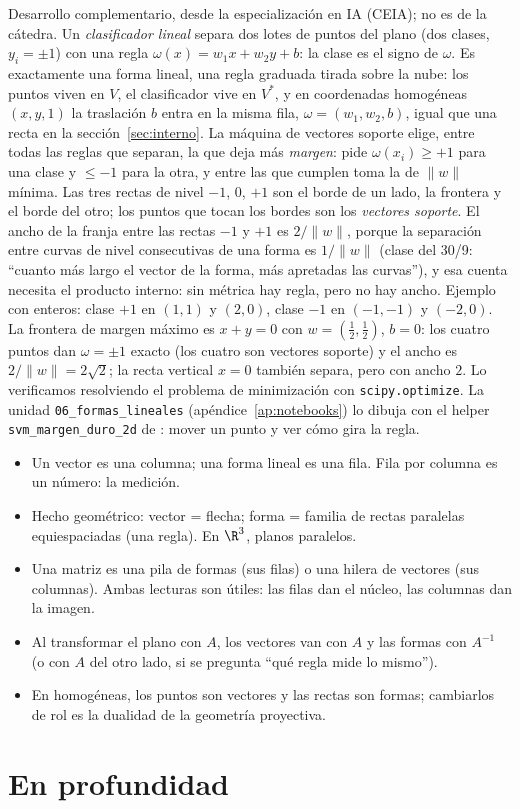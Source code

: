 \begin{idea}
Desarrollo complementario, desde la especialización en IA (CEIA); no es de la cátedra. Un
\emph{clasificador lineal} separa dos lotes de puntos del plano (dos clases, \(y_i=\pm1\))
con una regla \(\omega(x)=w_1x+w_2y+b\): la clase es el signo de \(\omega\). Es exactamente
una forma lineal, una regla graduada tirada sobre la nube: los puntos viven en \(V\), el
clasificador vive en \(V^{*}\), y en coordenadas homogéneas \((x,y,1)\) la traslación \(b\)
entra en la misma fila, \(\omega=(w_1,w_2,b)\), igual que una recta en la
sección~\ref{sec:interno}. La máquina de vectores soporte elige, entre todas las reglas
que separan, la que deja más \emph{margen}: pide \(\omega(x_i)\ge+1\) para una clase y
\(\le-1\) para la otra, y entre las que cumplen toma la de \(\|w\|\) mínima. Las tres
rectas de nivel \(-1\), \(0\), \(+1\) son el borde de un lado, la frontera y el borde del
otro; los puntos que tocan los bordes son los \emph{vectores soporte}. El ancho de la
franja entre las rectas \(-1\) y \(+1\) es \(2/\|w\|\), porque la separación entre
curvas de nivel consecutivas de una forma es \(1/\|w\|\) (clase del 30/9: ``cuanto más
largo el vector de la forma, más apretadas las curvas''), y esa cuenta necesita el
producto interno: sin métrica hay regla, pero no hay ancho. Ejemplo con enteros: clase
\(+1\) en \((1,1)\) y \((2,0)\), clase \(-1\) en \((-1,-1)\) y \((-2,0)\). La frontera
de margen máximo es \(x+y=0\) con \(w=(\tfrac12,\tfrac12)\), \(b=0\): los cuatro puntos
dan \(\omega=\pm1\) exacto (los cuatro son vectores soporte) y el ancho es
\(2/\|w\|=2\sqrt2\); la recta vertical \(x=0\) también separa, pero con ancho \(2\). Lo
verificamos resolviendo el problema de minimización con \texttt{scipy.optimize}. La unidad
\texttt{06\_formas\_lineales} (apéndice~\ref{ap:notebooks}) lo dibuja con el helper
\texttt{svm\_margen\_duro\_2d} de : mover un punto y ver cómo gira la regla.
\end{idea}

\begin{resultado}
\begin{itemize}
  \item Un vector es una columna; una forma lineal es una fila. Fila por columna es un
  número: la medición.
  \item Hecho geométrico: vector = flecha; forma = familia de rectas paralelas
  equiespaciadas (una regla). En \(\R^3\), planos paralelos.
  \item Una matriz es una pila de formas (sus filas) o una hilera de vectores (sus
  columnas). Ambas lecturas son útiles: las filas dan el núcleo, las columnas dan la imagen.
  \item Al transformar el plano con \(A\), los vectores van con \(A\) y las formas con
  \(A^{-1}\) (o con \(A\) del otro lado, si se pregunta ``qué regla mide lo mismo'').
  \item En homogéneas, los puntos son vectores y las rectas son formas; cambiarlos de rol
  es la dualidad de la geometría proyectiva.
\end{itemize}
\end{resultado}

\section{En profundidad}
